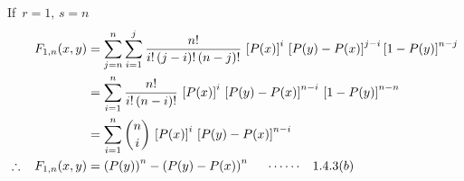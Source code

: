 \documentclass[12pt,a4paper]{report}
\theoremstyle{definition}
\theoremstyle{plain}
\begin{document}
If $\, r = 1, \, s = n$
\begin{align*}
F_{1,n}(x,y) & = \sum_{j = n}^n\sum^j_{i = 1}\frac{n!}{i!\, (j - i)!\, (n-j)!}\, \left[P(x)\right]^{i}\, \left[P(y) - P(x)\right]^{j-i}\left[1 - P(y)\right]^{n - j}\\
& = \sum^n_{i = 1}\frac{n!}{i!\, (n - i)!}\, \left[P(x)\right]^i\, \left[P(y) - P(x)\right]^{n - i}\, \left[1 - P(y)\right]^{n - n}\\
& = \sum^n_{i = 1}\binom{n}{i}\, \left[P(x)\right]^{i}\, \left[P(y) - P(x)\right]^{n - i}\\
\therefore\hspace{0.3cm} F_{1,n}(x,y) & = \left(P(y)\right)^n - \left(P(y) - P(x)\right)^n \hspace{0.5cm}\cdots\cdots\hspace{0.3cm} 1.4.3 (b)\\
\end{align*}
\end{document}
